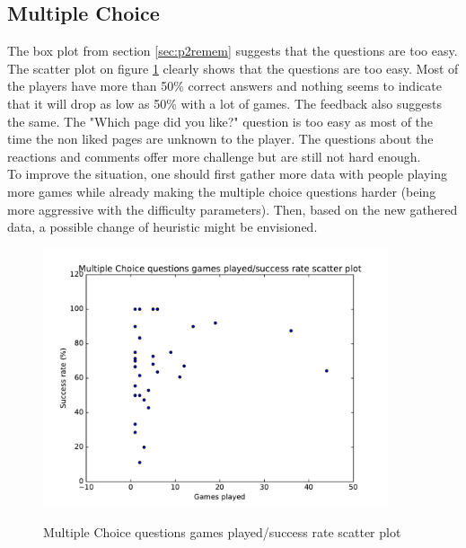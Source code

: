 \subsection{Multiple Choice}
The box plot from section \ref{sec:p2remem} suggests that the questions are too easy. The scatter plot on figure \ref{fig:mcScatter} clearly shows that the questions are too easy. Most of the players have more than 50\% correct answers and nothing seems to indicate that it will drop as low as 50\% with a lot of games. The feedback also suggests the same. The "Which page did you like?" question is too easy as most of the time the non liked pages are unknown to the player. The questions about the reactions and comments offer more challenge but are still not hard enough.\\
To improve the situation, one should first gather more data with people playing more games while already making the multiple choice questions harder (being more aggressive with the difficulty parameters). Then, based on the new gathered data, a possible change of heuristic might be envisioned.
\begin{figure}
\centering
{\includegraphics[width=4in]{images/mc_scatter.pdf}}
\caption{Multiple Choice questions games played/success rate scatter plot}
\label{fig:mcScatter}
\end{figure}
